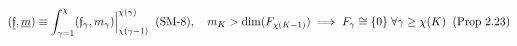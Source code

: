 \documentclass[preview]{standalone}
\begin{document}
\begin{align*}
\special{dvisvgm:raw <g id='unique000'>}(\underline{\mathfrak{f}}, \underline{m}) \equiv \int_{\gamma=1}^\chi (\mathfrak{f}_\gamma, m_\gamma)\Big|_{\chi(\gamma-1)}^{\chi(\gamma)}\;\; (\text{SM-8}), \quad m_K > \dim(F_{\chi(K-1)}) \implies F_\gamma \cong \{0\}\;\forall\gamma\ge\chi(K)\;\; (\text{Prop 2.23})\special{dvisvgm:raw </g>}
\end{align*}
\end{document}
